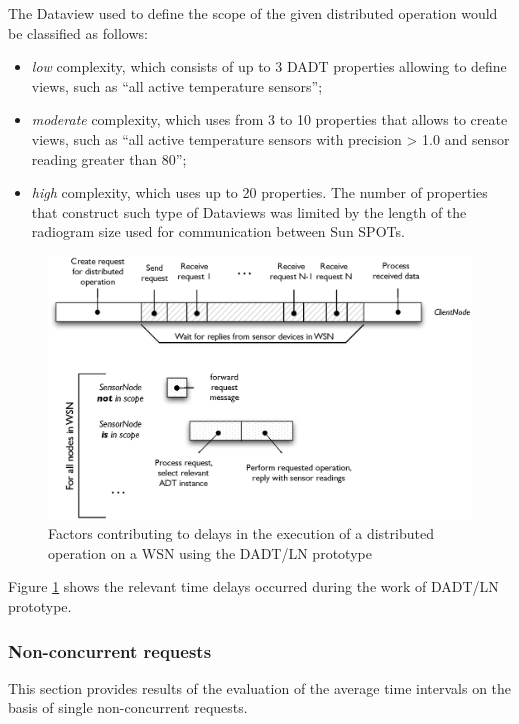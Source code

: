 The Dataview used to define the scope of the given distributed operation would be classified as follows:
\begin{itemize}
\item \emph{low} complexity, which consists of up to 3 DADT properties allowing to define
views, such as ``all active temperature sensors'';
\item \emph{moderate} complexity, which uses from 3 to 10 properties that allows to
create views, such as ``all active temperature
sensors with precision > 1.0 and sensor reading greater than 80'';
\item \emph{high} complexity, which uses up to 20 properties. The number of properties that construct such type of Dataviews was
limited by the length of the radiogram size used for communication between Sun SPOTs.
\end{itemize}

\begin{figure}
\centering
\includegraphics[scale=0.60]{img/RTTevaluation.eps} 
\caption[Delay factors for distributed operation execution]{Factors contributing to delays in the execution of a distributed operation on a WSN using the DADT/LN prototype}
\label{Fig:TimingsModel}
\end{figure}

Figure \ref{Fig:TimingsModel} shows the relevant time delays occurred during the
work of DADT/LN prototype. 

\subsubsection{Non-concurrent requests}

This section provides results of the evaluation of the average time intervals on the basis of single non-concurrent requests.

